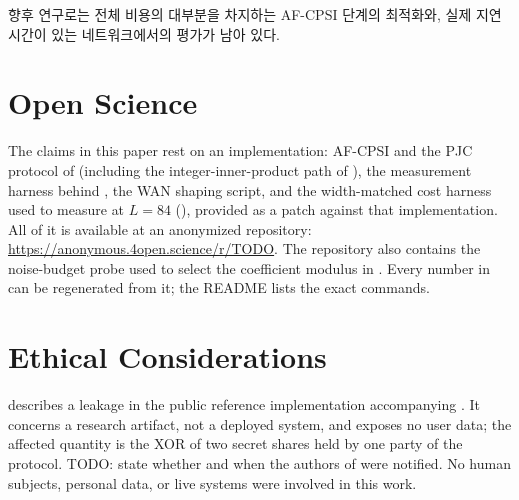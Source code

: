 \documentclass[sigconf,anonymous,review]{acmart}
\begin{document}
향후 연구로는 전체 비용의 대부분을 차지하는 AF-CPSI 단계의 최적화와, 실제
지연 시간이 있는 네트워크에서의 평가가 남아 있다.

\label{sec:end-of-body}



\appendix

\section{Open Science}
The claims in this paper rest on an implementation: AF-CPSI and the PJC
protocol of  (including the integer-inner-product path of
), the measurement harness behind
,
the WAN shaping script, and the width-matched cost harness used to measure
\cite{KLS26} at $L=84$ (), provided as a patch against
that implementation. All of it is available at an anonymized repository:
\url{https://anonymous.4open.science/r/TODO}. The repository also contains the
noise-budget probe used to select the coefficient modulus in
. Every number in  can be
regenerated from it; the README lists the exact commands.

\section{Ethical Considerations}
 describes a leakage in the public reference
implementation accompanying \cite{LTS+26}. It concerns a research artifact,
not a deployed system, and exposes no user data; the affected quantity is
the XOR of two secret shares held by one party of the protocol. TODO: state
whether and when the authors of \cite{LTS+26} were notified. No human
subjects, personal data, or live systems were involved in this work.
\end{document}

